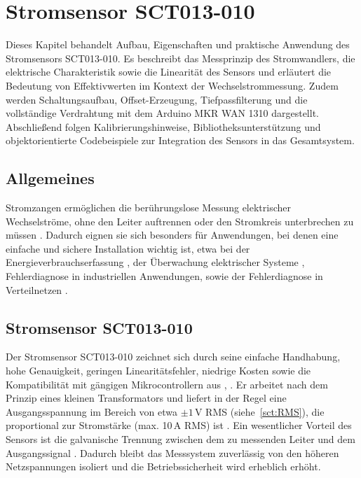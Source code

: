 %
%


\chapter{Stromsensor SCT013-010}
	Dieses Kapitel behandelt Aufbau, Eigenschaften und praktische Anwendung des Stromsensors SCT013-010. Es beschreibt das Messprinzip des Stromwandlers, die elektrische Charakteristik sowie die Linearität des Sensors und erläutert die Bedeutung von Effektivwerten im Kontext der Wechselstrommessung. Zudem werden Schaltungsaufbau, Offset-Erzeugung, Tiefpassfilterung und die vollständige Verdrahtung mit dem Arduino MKR WAN 1310 dargestellt. Abschlie{\ss}end folgen Kalibrierungshinweise, Bibliotheksunterstützung und objektorientierte Codebeispiele zur Integration des Sensors in das Gesamtsystem.
	
\section{Allgemeines}
	Stromzangen ermöglichen die berührungslose Messung elektrischer Wechselströme, ohne den Leiter auftrennen oder den Stromkreis unterbrechen zu müssen \cite[2]{Lai:2025}. Dadurch eignen sie sich besonders für Anwendungen, bei denen eine einfache und sichere Installation wichtig ist, etwa bei der Energieverbrauchserfassung \cite{Najmurrokhman:2023}, der Überwachung elektrischer Systeme \cite{Lai:2025}, Fehlerdiagnose in industriellen Anwendungen\cite{Dhomad:2020}, \cite{Katsigiannis:2023} sowie der Fehlerdiagnose in Verteilnetzen \cite{Salum:2025}.
	


\section{Stromsensor SCT013-010}
	Der Stromsensor SCT013-010 zeichnet sich durch seine einfache Handhabung, hohe Genauigkeit, geringen Linearitätsfehler, niedrige Kosten sowie die Kompatibilität mit gängigen Mikrocontrollern aus \cite{Katsigiannis:2023}, \cite{YHDC:2017}. Er arbeitet nach dem Prinzip eines kleinen Transformators und liefert in der Regel eine Ausgangsspannung im Bereich von etwa $\pm 1\,\text{V}$ RMS (siehe~\autoref{sct:RMS}), die proportional zur Stromstärke (max. 10\,A RMS) ist \cite{Miron:2016}. Ein wesentlicher Vorteil des Sensors ist die galvanische Trennung zwischen dem zu messenden Leiter und dem Ausgangssignal \cite[480]{Meier:2022}. Dadurch bleibt das Messsystem zuverlässig von den höheren Netzspannungen isoliert und die Betriebssicherheit wird erheblich erhöht.

